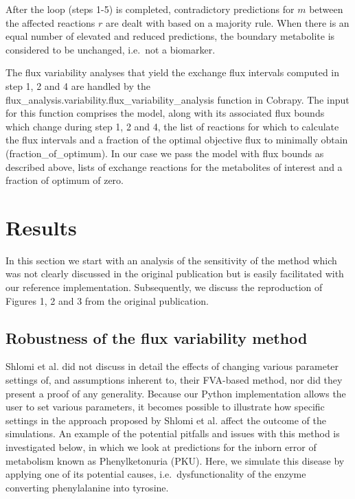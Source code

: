 \documentclass[10pt,a4paper,onecolumn]{article}
\begin{document}
After the loop (steps 1-5) is completed, contradictory predictions for
\(m\) between the affected reactions \(r\) are dealt with based on a
majority rule. When there is an equal number of elevated and reduced
predictions, the boundary metabolite is considered to be unchanged,
i.e.~not a biomarker.

The flux variability analyses that yield the exchange flux intervals
computed in step 1, 2 and 4 are handled by the
flux\_analysis.variability.flux\_variability\_analysis function in
Cobrapy. The input for this function comprises the model, along with its
associated flux bounds which change during step 1, 2 and 4, the list of
reactions for which to calculate the flux intervals and a fraction of
the optimal objective flux to minimally obtain (fraction\_of\_optimum).
In our case we pass the model with flux bounds as described above, lists
of exchange reactions for the metabolites of interest and a fraction of
optimum of zero.

\section{Results}\label{results}

In this section we start with an analysis of the sensitivity of the
method which was not clearly discussed in the original publication but
is easily facilitated with our reference implementation. Subsequently,
we discuss the reproduction of Figures 1, 2 and 3 from the original
publication.

\subsection{Robustness of the flux variability
method}\label{robustness-of-the-flux-variability-method}

Shlomi et al. did not discuss in detail the effects of changing various
parameter settings of, and assumptions inherent to, their FVA-based
method, nor did they present a proof of any generality. Because our
Python implementation allows the user to set various parameters, it
becomes possible to illustrate how specific settings in the approach
proposed by Shlomi et al. affect the outcome of the simulations. An
example of the potential pitfalls and issues with this method is
investigated below, in which we look at predictions for the inborn error
of metabolism known as Phenylketonuria (PKU). Here, we simulate this
disease by applying one of its potential causes, i.e.~dysfunctionality
of the enzyme converting phenylalanine into tyrosine.
\end{document}
